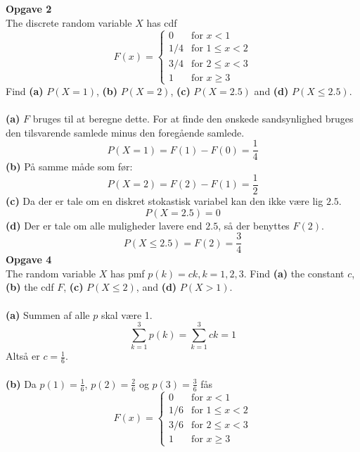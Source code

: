 \documentclass[12pt,a4paper,draft]{report}
\author{Frederik Appel Vardinghus-Nielsen}
\begin{document}
\noindent \textbf{Opgave 2}\\
The discrete random variable $X$ has cdf
\begin{equation}
F(x)=
\begin{cases}
0& \text{for } x<1\\
1/4& \text{for } 1\leq x<2\\
3/4& \text{for } 2\leq x<3\\
1& \text{for } x\geq 3
\end{cases}
\end{equation}
Find \textbf{(a)} $P(X=1)$, \textbf{(b)} $P(X=2)$, \textbf{(c)} $P(X=2.5)$ and \textbf{(d)} $P(X\leq 2.5)$.\\\\
\textbf{(a)} $F$ bruges til at beregne dette. For at finde den ønskede sandsynlighed bruges den tilsvarende samlede minus den foregående samlede.
\begin{equation}
P(X=1)=F(1)-F(0)=\frac{1}{4}
\end{equation}
\textbf{(b)} På samme måde som før:
\begin{equation}
P(X=2)=F(2)-F(1)=\frac{1}{2}
\end{equation}
\textbf{(c)} Da der er tale om en diskret stokastisk variabel kan den ikke være lig $2.5$.
\begin{equation}
P(X=2.5)=0
\end{equation}
\textbf{(d)} Der er tale om alle muligheder lavere end $2.5$, så der benyttes $F(2)$.
\begin{equation}
P(X\leq 2.5)=F(2)=\frac{3}{4}
\end{equation}
\textbf{Opgave 4}\\
The random variable $X$ has pmf $p(k)=ck,k=1,2,3$. Find \textbf{(a)} the constant $c$, \textbf{(b)} the cdf $F$, \textbf{(c)} $P(X\leq 2)$, and \textbf{(d)} $P(X>1)$.\\\\
\textbf{(a)} Summen af alle $p$ skal være 1.
\begin{equation}
\sum_{k=1}^{3}p(k)=\sum_{k=1}^{3}ck=1
\end{equation}
Altså er $c=\frac{1}{6}$.\\\\
\textbf{(b)} Da $p(1)=\frac{1}{6}$, $p(2)=\frac{2}{6}$ og $p(3)=\frac{3}{6}$ fås
\begin{equation}
F(x)=
\begin{cases}
0&\text{for } x<1\\
1/6&\text{for } 1\leq x<2\\
3/6&\text{for } 2\leq x<3\\
1&\text{for } x\geq 3
\end{cases}
\end{equation}
\end{document}
